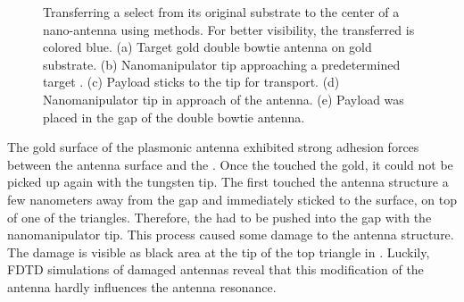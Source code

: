 \begin{figure}[!htb]
\begin{subfigure}{ 0.49\linewidth}
				\end{subfigure}
				\hfill
				\begin{subfigure}{ 0.49\linewidth}
					\centering
					\caption{}
					\label{subfig::pp_payload_delivered}
				\end{subfigure}
				\caption[Pick-and-place of \nd to antenna]{Transferring a select \nd from its original substrate to the center of a nano-antenna using \pp methods. For better visibility, the transferred \nds is colored blue. (a) Target gold double bowtie antenna on gold substrate. (b) Nanomanipulator tip approaching a predetermined target \nd. (c) Payload \nd sticks to the tip for transport. (d) Nanomanipulator tip in approach of the antenna. (e) Payload \nd was placed in the gap of the double bowtie antenna.}
				\label{fig::pp_antenna}
			\end{figure}

			\FloatBarrier

			The gold surface of the plasmonic antenna exhibited strong adhesion forces between the antenna surface and the \nd.
			Once the \nd touched the gold, it could not be picked up again with the tungsten tip.
			The \nd first touched the antenna structure a few nanometers away from the gap and immediately sticked to the surface, on top of one of the triangles.
			Therefore, the \nd had to be pushed into the gap with the nanomanipulator tip.
			This process caused some damage to the antenna structure.
			The damage is visible as black area at the tip of the top triangle in .
			Luckily, FDTD simulations of damaged antennas reveal that this modification of the antenna hardly influences the antenna resonance.

